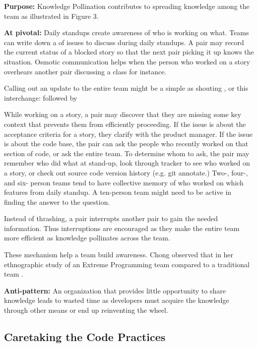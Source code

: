 \begin{table}[]
\textbf{Purpose:} Knowledge Pollination contributes to spreading knowledge among the team as illustrated in Figure 3.

\textbf{At pivotal:} Daily standups create awareness of who is working on what. Teams can write down a  of issues to discuss during daily standups. A pair may record the current status of a blocked story so that the next pair picking it up knows the situation. Osmotic communication helps when the person who worked on a story overhears another pair discussing a class for instance.

Calling out an update to the entire team might be a simple as shouting , or this interchange:   followed by 

While working on a story, a pair may discover that they are missing some key context that prevents them from efficiently proceeding. If the issue is about the acceptance criteria for a story, they clarify with the product manager. If the issue is about the code base, the pair can ask the people who recently worked on that section of code, or ask the entire team.  To determine whom to ask, the pair may remember who did what at stand-up, look through tracker to see who worked on a story, or check out source code version history (e.g. git annotate.) Two-, four-, and six- person teams tend to have collective memory of who worked on which features from daily standup. A ten-person team might need to be active in finding the answer to the question. 

Instead of thrashing, a pair interrupts another pair to gain the needed information. Thus interruptions are encouraged as they make the entire team more efficient as knowledge pollinates across the team. 

These mechanism help a team build awareness. Chong observed that  in her ethnographic study of an Extreme Programming team compared to a traditional team \cite{ChongNominum}.
 
\textbf{Anti-pattern:} An organization that provides little opportunity to share knowledge leads to wasted time as developers must acquire the knowledge through other means or end up reinventing the wheel.
\subsection{Caretaking the Code Practices}

\end{table}
